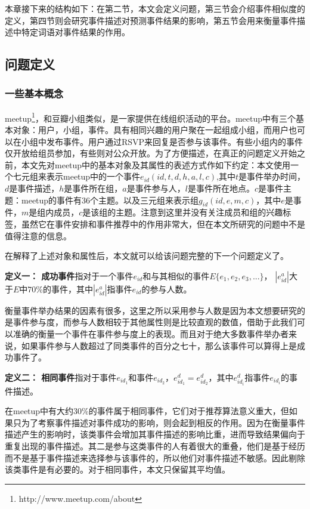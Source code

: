 本章接下来的结构如下：在第二节，本文会定义问题，第三节会介绍事件相似度的定义，第四节则会研究事件描述对预测事件结果的影响，第五节会用来衡量事件描述中特定词语对事件结果的作用。

\subsection{问题定义}
\subsubsection{一些基本概念}
meetup\footnote{http://www.meetup.com/about}，和豆瓣小组类似，是一家提供在线组织活动的平台。meetup中有三个基本对象：用户，小组，事件。具有相同兴趣的用户聚在一起组成小组，而用户也可以在小组中发布事件。用户通过RSVP来回复是否参与该事件。有些小组内的事件仅开放给组员参加，有些则对公众开放。为了方便描述，在真正的问题定义开始之前，本文先对meetup中的基本对象及其属性的表述方式作如下约定：本文使用一个七元组来表示meetup中的一个事件\(e_{id}(id,t,d,h,a,l,c)\),其中\(t\)是事件举办时间，\(d\)是事件描述，\(h\)是事件所在组，\(a\)是事件参与人，\(l\)是事件所在地点。\(c\)是事件主题：meetup的事件有36个主题。以及三元组来表示组\(g_{id}(id,e,m,c)\)，其中\(e\)是事件，\(m\)是组内成员，\(c\)是该组的主题。注意到这里并没有关注成员和组的兴趣标签，虽然它在事件安排和事件推荐中的作用非常大，但在本文所研究的问题中不是值得注意的信息。

在解释了上述对象和属性后，本文就可以给该问题完整的下一个问题定义了。

\textbf{定义一： 成功事件}指对于一个事件\(e_{id}\)和与其相似的事件\(E\{e_1,e_2,e_3,...\}\)，
\(|e_{id}^a|\)大于\(E\)中\(70\)\%的事件，其中$|e_{id}^a|$指事件$e_{id}$的参与人数。

衡量事件举办结果的因素有很多，这里之所以采用参与人数是因为本文想要研究的是事件参与度，而参与人数相较于其他属性则是比较直观的数值，借助于此我们可以准确的衡量一个事件在事件参与度上的表现。而且对于绝大多数事件举办者来说，如果事件参与人数超过了同类事件的百分之七十，那么该事件可以算得上是成功事件了。

\textbf{定义二： 相同事件}指对于事件\(e_{id_1}\)和事件\(e_{id_2}\)，\(e_{id_1}^d=e_{id_2}^d\)，其中$e_{id_i}^d$指事件$e_{id_i}$的事件描述。

在meetup中有大约30\%的事件属于相同事件，它们对于推荐算法意义重大，但如果只为了考察事件描述对事件成功的影响，则会起到相反的作用。因为在衡量事件描述产生的影响时，该类事件会增加其事件描述的影响比重，进而导致结果偏向于重复出现的事件描述。其二是参与这类事件的人有着很大的重叠，他们是基于经历而不是基于事件描述来选择参与该事件的，所以他们对事件描述不敏感。因此剔除该类事件是有必要的。对于相同事件，本文只保留其平均值。

